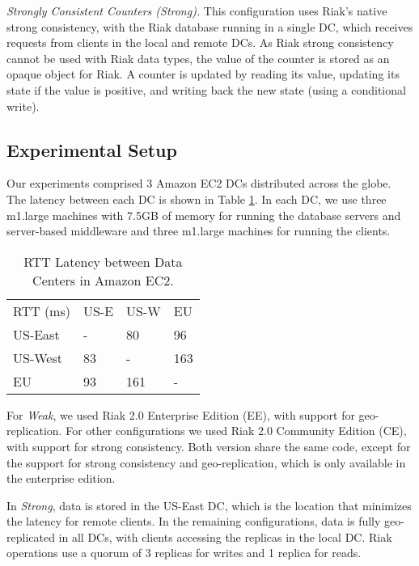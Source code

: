 \documentclass[conference]{IEEEtran}
\begin{document}
\emph{Strongly Consistent Counters (Strong).} 
This configuration uses Riak's native strong consistency, with
the Riak database running in a single DC, which 
receives requests from clients in the local and remote DCs.
As Riak strong consistency cannot be used with Riak data types, the
value of the counter is stored as an opaque object for Riak.
A counter is updated by reading its value, updating its state if the value is
positive, and writing back the new state (using a conditional write).




\subsection{Experimental Setup}

Our experiments comprised 3 Amazon EC2 DCs distributed across the globe.
The latency between each DC is shown in Table \ref{table:latency_table}.
In each DC, we use three m1.large machines with 7.5GB of memory for running 
the database servers and server-based middleware and three m1.large machines
for running the clients.

\begin{table}[h]
\center
\begin{tabular}{llll}
RTT (ms) & US-E & US-W & EU \\
US-East    & -        & 80   & 96        \\
US-West      & 83       & -      & 163     \\
EU      & 93     & 161    & -        
\end{tabular}
\caption{RTT Latency between Data Centers in Amazon EC2.}
\label{table:latency_table}
\end{table}

For \emph{Weak}, we used Riak 2.0 Enterprise Edition (EE), with support
for geo-replication. 
For other configurations we used Riak 2.0 Community Edition (CE), with support for
strong consistency. 
Both version share the same code, except for the support for strong consistency and
geo-replication, which is only available in the enterprise edition.

In \emph{Strong}, data is stored in the US-East DC, which is the location that
minimizes the latency for remote clients.
In the remaining configurations, data is fully geo-replicated in all DCs, with
clients accessing the replicas in the local DC.
Riak operations use a quorum of 3 replicas for writes and 1 replica for reads.
\end{document}
